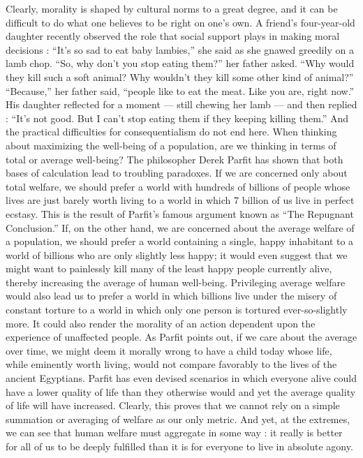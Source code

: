 \documentclass[a4paper,14pt]{extarticle}
\begin{document}
Clearly, morality is shaped by cultural norms to a great degree, and it can be difficult to do what one believes to be right on one's own.
A friend's four-year-old daughter recently observed the role that social support plays in making moral decisions :
``It's so sad to eat baby lambies,'' she said as she gnawed greedily on a lamb chop.
``So, why don't you stop eating them?'' her father asked.
``Why would they kill such a soft animal?
Why wouldn't they kill some other kind of animal?''
``Because,'' her father said, ``people like to eat the meat. Like you are, right now.''
His daughter reflected for a moment --- still chewing her lamb --- and then replied :
``It's not good.
But I can't stop eating them if they keeping killing them.''
And the practical difficulties for consequentialism do not end here.
When thinking about maximizing the well-being of a population, are we thinking in terms of total or average well-being?
The philosopher Derek Parfit has shown that both bases of calculation lead to troubling paradoxes.
If we are concerned only about total welfare, we should prefer a world with hundreds of billions of people whose lives are just barely worth living to a world in which 7 billion of us live in perfect ecstasy.
This is the result of Parfit's famous argument known as ``The Repugnant Conclusion.''
If, on the other hand, we are concerned about the average welfare of a population, we should prefer a world containing a single, happy inhabitant to a world of billions who are only slightly less happy;
it would even suggest that we might want to painlessly kill many of the least happy people currently alive, thereby increasing the average of human well-being.
Privileging average welfare would also lead us to prefer a world in which billions live under the misery of constant torture to a world in which only one person is tortured ever-so-slightly more.
It could also render the morality of an action dependent upon the experience of unaffected people.
As Parfit points out, if we care about the average over time, we might deem it morally wrong to have a child today whose life, while eminently worth living, would not compare favorably to the lives of the ancient Egyptians.
Parfit has even devised scenarios in which everyone alive could have a lower quality of life than they otherwise would and yet the average quality of life will have increased.
Clearly, this proves that we cannot rely on a simple summation or averaging of welfare as our only metric.
And yet, at the extremes, we can see that human welfare must aggregate in some way :
it really is better for all of us to be deeply fulfilled than it is for everyone to live in absolute agony.
\end{document}
